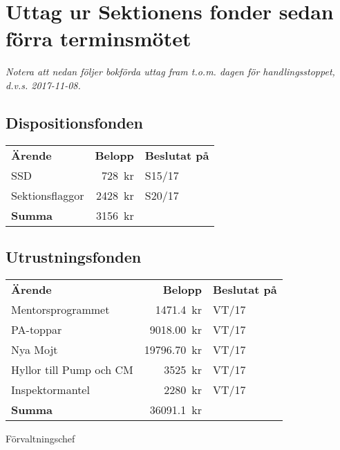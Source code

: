 \documentclass[../_main/handlingar.tex]{subfiles}
\begin{document}
\section{Uttag ur Sektionens fonder sedan förra terminsmötet}
\emph{Notera att nedan följer bokförda uttag fram t.o.m. dagen för handlingsstoppet, d.v.s. 2017-11-08.}

\subsection*{Dispositionsfonden}
\begin{tabular}{l r l}
    \textbf{Ärende} & \textbf{Belopp} & \textbf{Beslutat på} \\
    SSD & \SI{728}{kr} & S15/17 \\
    Sektionsflaggor & \SI{2428}{kr} & S20/17 \\
    \hline
    \textbf{Summa} & \SI{3156}{kr} \\
\end{tabular}

\subsection*{Utrustningsfonden}
\begin{tabular}{l r l}
    \textbf{Ärende} & \textbf{Belopp} & \textbf{Beslutat på} \\
    Mentorsprogrammet & \SI{1471.4}{kr} & VT/17 \\
    PA-toppar & \SI{9018.00}{kr} & VT/17 \\
    Nya Mojt & \SI{19796.70}{kr} & VT/17 \\
    Hyllor till Pump och CM & \SI{3525}{kr} & VT/17 \\
    Inspektormantel & \SI{2280}{kr} & VT/17 \\
    \hline
    \textbf{Summa} & \SI{36091.1}{kr} \\
\end{tabular}

\begin{signatures}{1}
    \ist
    \signature{Sophia Grimmeiss Grahm}{Förvaltningschef}
\end{signatures}
\end{document}
